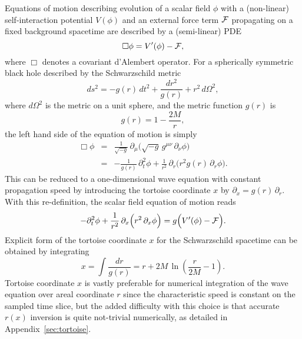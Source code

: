 \documentclass[aps,prd,reprint,twocolumn,groupedaddress]{revtex4-1}
\begin{document}
Equations of motion describing evolution of a scalar field $\phi$ with a (non-linear) self-interaction potential $V(\phi)$ and an external force term ${\cal F}$ propagating on a fixed background spacetime are described by a (semi-linear) PDE
\begin{equation}
  \Box\phi = V'(\phi) - {\cal F},
\end{equation}
where $\Box$ denotes a covariant d'Alembert operator. For a spherically symmetric black hole described by the Schwarzschild metric
\begin{equation}
  ds^2 = -g(r)\, dt^2 + \frac{dr^2}{g(r)} + r^2\, d\Omega^2,
\end{equation}
where $d\Omega^2$ is the metric on a unit sphere, and the metric function $g(r)$ is
\begin{equation}
  g(r) = 1 - \frac{2M}{r},
\end{equation}
the left hand side of the equation of motion is simply
\begin{eqnarray}
  \Box\phi &=& 
  \frac{1}{\sqrt{-g}}\, \partial_\mu \Big( \sqrt{-g}\, g^{\mu\nu}\, \partial_\nu \phi \Big)\nonumber\\ &=&
  - \frac{1}{g(r)}\, \partial_t^2 \phi + \frac{1}{r^2}\, \partial_r \Big( r^2 g(r)\, \partial_r \phi \Big).
\end{eqnarray}
This can be reduced to a one-dimensional wave equation with constant propagation speed by introducing the tortoise coordinate $x$ by $\partial_x = g(r)\, \partial_r$. With this re-definition, the scalar field equation of motion reads
\begin{equation}\label{eq:wave}
  - \partial_t^2 \phi + \frac{1}{r^2}\, \partial_x \Big( r^2\, \partial_x \phi \Big) = g \Big( V'(\phi) - {\cal F} \Big).
\end{equation}
Explicit form of the tortoise coordinate $x$ for the Schwarzschild spacetime can be obtained by integrating
\begin{equation}
  x = \int \frac{dr}{g(r)} = r + 2M\,\ln\left(\frac{r}{2M} - 1\right).
\end{equation}
Tortoise coordinate $x$ is vastly preferable for numerical integration of the wave equation over areal coordinate $r$ since the characteristic speed is constant on the sampled time slice, but the added difficulty with this choice is that accurate $r(x)$ inversion is quite not-trivial numerically, as detailed in Appendix~\ref{sec:tortoise}.
\end{document}
